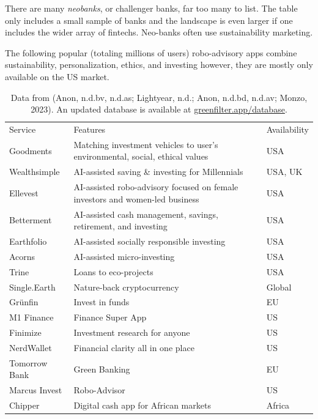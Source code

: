 \documentclass[
  letterpaper,
  DIV=11,
  numbers=noendperiod]{scrartcl}
\begin{document}
There are many \emph{neobanks}, or challenger banks, far too many to
list. The table only includes a small sample of banks and the landscape
is even larger if one includes the wider array of fintechs. Neo-banks
often use sustainability marketing.

The following popular (totaling millions of users) robo-advisory apps
combine sustainability, personalization, ethics, and investing however,
they are mostly only available on the US market.

\begin{longtable}[]{@{}
  >{\raggedright\arraybackslash}p{}
  >{\raggedright\arraybackslash}p{}
  >{\raggedright\arraybackslash}p{}@{}}
\caption{Data from (Anon, n.d.bv, n.d.as; Lightyear, n.d.; Anon, n.d.bd,
n.d.av; Monzo, 2023). An updated database is available at
\href{https://www.greenfilter.app/database}{greenfilter.app/database}.}\tabularnewline
\toprule\noalign{}
\endfirsthead
\endhead
\bottomrule\noalign{}
\endlastfoot
Service & Features & Availability \\
Goodments & Matching investment vehicles to user's environmental,
social, ethical values & USA \\
Wealthsimple & AI-assisted saving \& investing for Millennials & USA,
UK \\
Ellevest & AI-assisted robo-advisory focused on female investors and
women-led business & USA \\
Betterment & AI-assisted cash management, savings, retirement, and
investing & USA \\
Earthfolio & AI-assisted socially responsible investing & USA \\
Acorns & AI-assisted micro-investing & USA \\
Trine & Loans to eco-projects & USA \\
Single.Earth & Nature-back cryptocurrency & Global \\
Grünfin & Invest in funds & EU \\
M1 Finance & Finance Super App & US \\
Finimize & Investment research for anyone & US \\
NerdWallet & Financial clarity all in one place & US \\
Tomorrow Bank & Green Banking & EU \\
Marcus Invest & Robo-Advisor & US \\
Chipper & Digital cash app for African markets & Africa \\

\end{longtable}
\end{document}
